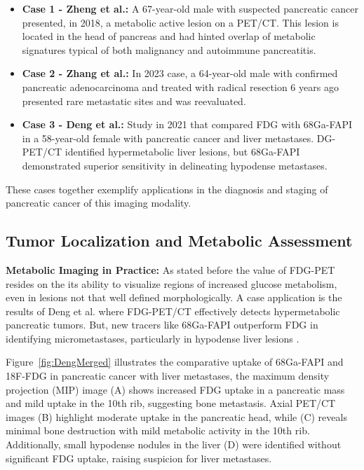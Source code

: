 \documentclass[11pt]{article} %
\begin{document}
\begin{itemize}
    \item \textbf{Case 1 - Zheng et al.:} 
    A 67-year-old male  with suspected pancreatic cancer presented, in 2018, a metabolic active lesion on a PET/CT. This lesion is located in the head of pancreas and had hinted overlap of metabolic signatures typical of both malignancy and autoimmune pancreatitis\cite{Zheng2018}.
    \item \textbf{Case 2 - Zhang et al.:} 
    In 2023 case, a 64-year-old male with confirmed pancreatic adenocarcinoma and treated with radical resection 6 years ago presented rare metastatic sites and was reevaluated\cite{Zhang2023}.
    \item \textbf{Case 3 - Deng et al.:} 
    Study in 2021 that compared FDG with 68Ga-FAPI in a 58-year-old female with pancreatic cancer and liver metastases. DG-PET/CT identified hypermetabolic liver lesions, but 68Ga-FAPI demonstrated superior sensitivity in delineating hypodense metastases\cite{Deng2021}.
\end{itemize}

These cases together exemplify applications in the diagnosis and staging of pancreatic cancer of this imaging modality.

\subsection{Tumor Localization and Metabolic Assessment}

\textbf{Metabolic Imaging in Practice:} As stated before the value of FDG-PET resides on the its ability to visualize regions of increased glucose metabolism, even in lesions not that well defined morphologically. A case application is the results of Deng et al. where FDG-PET/CT effectively detects hypermetabolic pancreatic tumors. But, new tracers like 68Ga-FAPI outperform FDG in identifying micrometastases, particularly in hypodense liver lesions \cite{Deng2021}.

Figure~\ref{fig:DengMerged} illustrates the comparative uptake of 68Ga-FAPI and 18F-FDG in pancreatic cancer with liver metastases, the maximum density projection (MIP) image (A) shows increased FDG uptake in a pancreatic mass and mild uptake in the 10th rib, suggesting bone metastasis. Axial PET/CT images (B) highlight moderate uptake in the pancreatic head, while (C) reveals minimal bone destruction with mild metabolic activity in the 10th rib. Additionally, small hypodense nodules in the liver (D) were identified without significant FDG uptake, raising suspicion for liver metastases.
\end{document}
